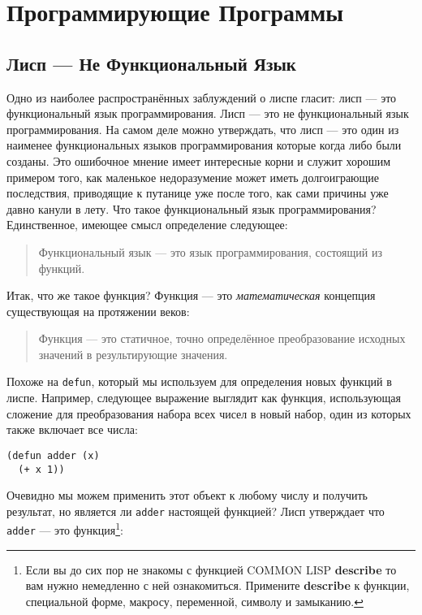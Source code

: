 \chapter{Программирующие Программы}\label{chapter_programs_that_program}
\section{Лисп --- Не Функциональный Язык}\label{section_lisp_is_not_functional}

Одно из наиболее распространённых заблуждений о лиспе гласит: лисп --- это функциональный язык программирования. Лисп --- это не функциональный язык программирования. На самом деле можно утверждать, что лисп --- это один из наименее функциональных языков программирования которые когда либо были созданы. Это ошибочное мнение имеет интересные корни и служит хорошим примером того, как маленькое недоразумение может иметь долгоиграющие последствия, приводящие к путанице уже после того, как сами причины уже давно канули в лету. Что такое функциональный язык программирования? Единственное, имеющее смысл определение следующее:

\begin{quote}
Функциональный язык --- это язык программирования, состоящий из функций.
\end{quote}
 
Итак, что же такое функция? Функция --- это \emph{математическая} концепция существующая на протяжении веков: 
 
\begin{quote}
Функция --- это статичное, точно определённое преобразование исходных значений в результирующие значения. 
\end{quote}
 
Похоже на \verb"defun", который мы используем для определения новых функций в лиспе. Например, следующее выражение выглядит как функция, использующая сложение для преобразования набора всех чисел в новый набор, один из которых также включает все числа: 
 
\begin{verbatim}
(defun adder (x)
  (+ x 1))
\end{verbatim}
 
Очевидно мы можем применить этот объект к любому числу и получить результат, но является ли \verb"adder" настоящей функцией? Лисп утверждает что \verb"adder" --- это функция\footnote{Если вы до сих пор не знакомы с функцией COMMON LISP \textbf{describe} то вам нужно немедленно с ней ознакомиться. Примените \textbf{describe} к функции, специальной форме, макросу, переменной, символу и замыканию.}: 

